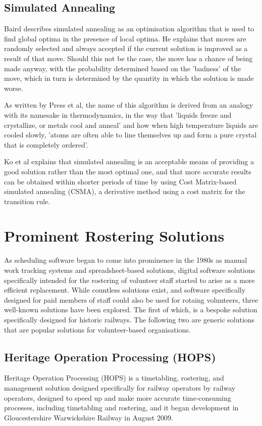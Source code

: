 \subsection{Simulated Annealing}
Baird describes simulated annealing as an optimisation algorithm that is used to find global optima in the presence of local optima. He explains that moves are randomly selected and always accepted if the current solution is improved as a result of that move. Should this not be the case, the move has a chance of being made anyway, with the probability determined based on the 'badness' of the move, which in turn is determined by the quantity in which the solution is made worse. \cite{Baird1998}

As written by Press et al, the name of this algorithm is derived from an analogy with its namesake in thermodynamics, in the way that 'liquids freeze and crystallize, or metals cool and anneal' and how when high temperature liquids are cooled slowly, 'atoms are often able to line themselves up and form a pure crystal that is completely ordered'. \cite{Press:1992:NRC:148286}

Ko et al explains that simulated annealing is an acceptable means of providing a good solution rather than the most optimal one, and that more accurate results can be obtained within shorter periods of time by using Cost Matrix-based simulated annealing (CSMA), a derivative method using a cost matrix for the transition rule. \cite{ko2013efficient}

\section{Prominent Rostering Solutions}
As scheduling software began to come into prominence in the 1980s as manual work tracking systems and spreadsheet-based solutions, digital software solutions specifically intended for the rostering of volunteer staff started to arise as a more efficient replacement. While countless solutions exist, and software specifically designed for paid members of staff could also be used for rotaing volunteers, three well-known solutions have been explored. The first of which, is a bespoke solution specifically designed for historic railways. The following two are generic solutions that are popular solutions for volunteer-based organisations.

\subsection{Heritage Operation Processing (HOPS)}
Heritage Operation Processing (HOPS) is a timetabling, rostering, and management solution designed specifically for railway operators by railway operators, designed to speed up and make more accurate time-consuming processes, including timetabling and rostering, and it began development in Gloucestershire Warwickshire Railway in August 2009. \cite{Hops1}


